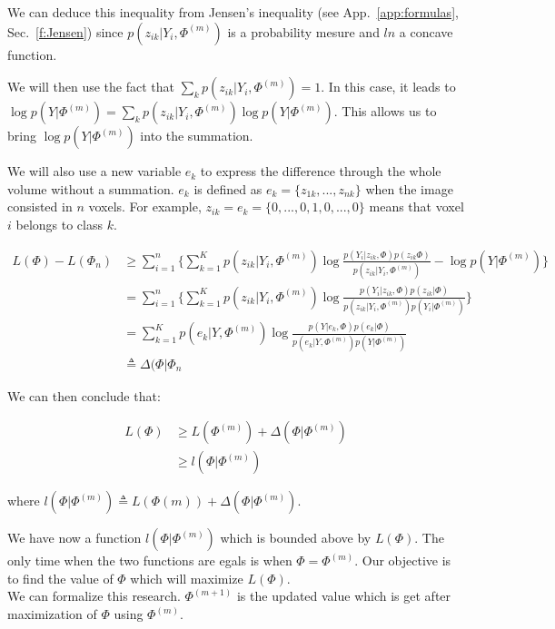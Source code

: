 We can deduce this inequality from Jensen's inequality (see App.~\ref{app:formulas}, Sec.~\ref{f:Jensen}) since  $p(z_{ik}|Y_i,\Phi^{(m)})$ is a probability mesure and $ln$ a concave function. %

\par
We will then use the fact that  $\sum_k p(z_{ik}|Y_i,\Phi^{(m)})=1$. In this case, it leads to $\operatorname*{log} p(Y|\Phi^{(m)})=\sum_k p(z_{ik}|Y_i,\Phi^{(m)})\operatorname*{log} p(Y|\Phi^{(m)})$. This allows us to bring $\operatorname*{log} p(Y|\Phi^{(m)})$ into the summation. 
\par
We will also use a new variable $e_k$ to express the difference through the whole volume without a summation. $e_k$ is defined as $e_k=\{z_{1k}, ..., z_{nk}\}$ when the image consisted in $n$ voxels. For example, $z_{ik}=e_k=\{0,...,0,1,0,...,0\}$ means that voxel $i$ belongs to class $k$.

  \begin{align*}
  L(\Phi)-L(\Phi_n) &\geq \sum_{i=1}^n\{\sum_{k=1}^K p(z_{ik}|Y_i,\Phi^{(m)})\operatorname*{log} \frac{p(Y_i|z_{ik},\Phi)p(z_{ik}\Phi)}{p(z_{ik}|Y_i,\Phi^{(m)})}-\operatorname*{log} p(Y|\Phi^{(m)})\} \\
                    &=\sum_{i=1}^n\{\sum_{k=1}^K   p(z_{ik}|Y_i,\Phi^{(m)})\operatorname*{log} \frac{p(Y_i|z_{ik},\Phi)p(z_{ik}|\Phi)}{p(z_{ik}|Y_i,\Phi^{(m)})p(Y_i|\Phi^{(m)})}\}\\
                    &=\sum_{k=1}^K   p(e_{k}|Y,\Phi^{(m)})\operatorname*{log} \frac{p(Y|e_{k},\Phi)p(e_{k}|\Phi)}{p(e_{k}|Y,\Phi^{(m)})p(Y|\Phi^{(m)})}\\
                    &\triangleq \Delta(\Phi|\Phi_n
  \end{align*}

We can then conclude that:

  \begin{align*}
  L(\Phi) &\geq L(\Phi^{(m)}) + \Delta(\Phi|\Phi^{(m)})\\
          &\geq l(\Phi|\Phi^{(m)})
  \end{align*}

where $l(\Phi|\Phi^{(m)}) \triangleq  L(\Phi{(m)}) + \Delta(\Phi|\Phi^{(m)})$.\\
\par
We have now a function $l(\Phi|\Phi^{(m)})$ which is bounded above by $L(\Phi)$. The only time when the two functions are egals is when $\Phi=\Phi^{(m)}$.
Our objective is to find the value of $\Phi$ which will maximize $L(\Phi)$. \\
We can formalize this research. $\Phi^{(m+1)}$ is the updated value which is get after maximization of $\Phi$ using $\Phi^{(m)}$. %

